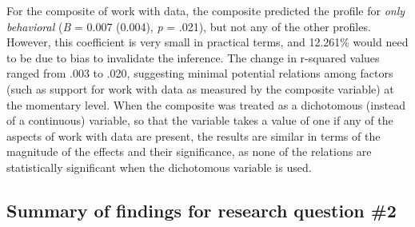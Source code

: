 \documentclass[]{book}
\theoremstyle{definition}
\theoremstyle{definition}
\theoremstyle{definition}
\theoremstyle{remark}
\begin{document}
For the composite of work with data, the composite predicted the profile
for \emph{only behavioral} (\emph{B} = 0.007 (0.004), \emph{p} = .021),
but not any of the other profiles. However, this coefficient is very
small in practical terms, and 12.261\% would need to be due to bias to
invalidate the inference. The change in r-squared values ranged from
.003 to .020, suggesting minimal potential relations among factors (such
as support for work with data as measured by the composite variable) at
the momentary level. When the composite was treated as a dichotomous
(instead of a continuous) variable, so that the variable takes a value
of one if any of the aspects of work with data are present, the results
are similar in terms of the magnitude of the effects and their
significance, as none of the relations are statistically significant
when the dichotomous variable is used.

\begin{landscape}\begin{table}

\caption{\label{tab:just-composite-red}Results of mixed effects models for the composite}
\centering
{}
\end{table}
\end{landscape}

\subsection{Summary of findings for research question
\#2}\label{summary-of-findings-for-research-question-2}
\end{document}
